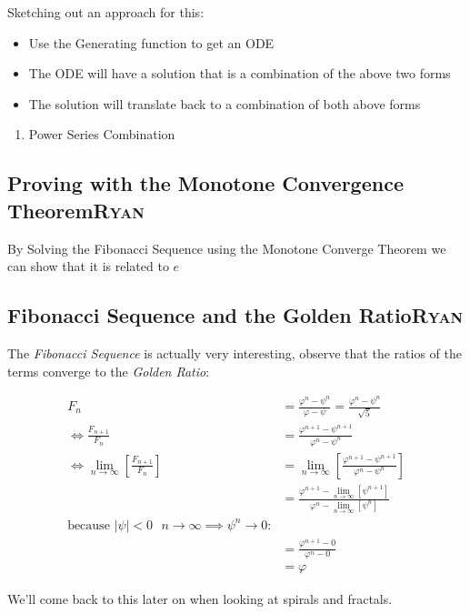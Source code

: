 \documentclass[a4paper,11pt,twoside]{article}
\begin{document}
Sketching out an approach for this:

\begin{itemize}
\item Use the Generating function to get an ODE
\item The ODE will have a solution that is a combination of the above two forms
\item The solution will translate back to a combination of both above forms
\end{itemize}
\begin{enumerate}
\item Power Series Combination
\label{power-series-comb}
\end{enumerate}
\subsection{Proving with the Monotone Convergence Theorem\hfill{}\textsc{Ryan}}
\label{sec:org3fb6a23}
By Solving the Fibonacci Sequence using the Monotone Converge Theorem we can show that it is related to \(e\)
\subsection{Fibonacci Sequence and the Golden Ratio\hfill{}\textsc{Ryan}}
\label{fib-golden-ratio-proof}
The \emph{Fibonacci Sequence} is actually very interesting, observe that the ratios of the terms converge to the \emph{Golden Ratio}:

\begin{align*}
    F_n &= \frac{\varphi^n-\psi^n}{\varphi-\psi} = \frac{\varphi^n-\psi^n}{\sqrt 5} \\
    \iff \frac{F_{n+1}}{F_n}	&= \frac{\varphi^{n+ 1} - \psi^{n+  1}}{\varphi^{n} - \psi^{n}} \\
    \iff \lim_{n \rightarrow \infty}\left[ \frac{F_{n+1}}{F_n} \right]	&= \lim_{n \rightarrow \infty}\left[ \frac{\varphi^{n+ 1} - \psi^{n+  1}}{\varphi^{n} - \psi^{n}} \right] \\
&= \frac{\varphi^{n+ 1} -\lim_{n \rightarrow \infty}\left[ \psi^{n +  1} \right] }{\varphi^{n} - \lim_{n \rightarrow \infty}\left[ \psi^n \right] } \\
\text{because $\mid \psi \mid < 0$ $n \rightarrow \infty \implies \psi^{n} \rightarrow 0$:} \\
&= \frac{\varphi^{n+  1} -  0}{\varphi^{n} -  0} \\
&= \varphi
\end{align*}

We'll come back to this later on when looking at spirals and fractals.
\end{document}
